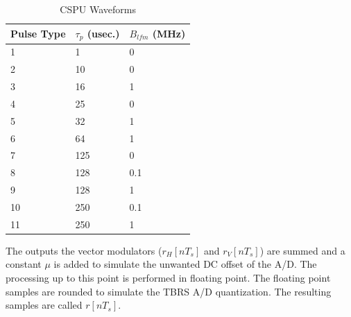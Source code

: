 \documentclass[12pt,english]{article}
\newcommand{\ls}{\left[}
\newcommand{\rs}{\right]}
\begin{document}
\begin{table}[ht]
  \noindent \begin{centering}
  \caption{CSPU Waveforms}
  \medskip{}
  \label{tab:cspuWfms}
  \begin{tabular}{|l|l|l|}
  \hline
  Pulse Type  & $\tau_p$ (usec.) & $B_{lfm}$ (MHz) \\ \hline
  1           &  1               &  0          \\ \hline
  2           &  10              &  0          \\ \hline
  3           &  16              &  1          \\ \hline
  4           &  25              &  0          \\ \hline
  5           &  32              &  1          \\ \hline
  6           &  64              &  1          \\ \hline
  7           &  125             &  0          \\ \hline
  8           &  128             &  0.1        \\ \hline
  9           &  128             &  1          \\ \hline
  10          &  250             &  0.1        \\ \hline
  11          &  250             &  1          \\ \hline
  \end{tabular}
  \par \end{centering}
\end{table}

The outputs the vector modulators ($r_H \ls n T_s \rs$ and $r_V \ls n
T_s \rs$) are summed and a constant $\mu$ is added to simulate the
unwanted DC offset of the A/D. The processing up to this point is
performed in floating point. The floating point samples are rounded to
simulate the TBRS A/D quantization. The resulting samples are called
$r \ls n T_s \rs$.
\end{document}
